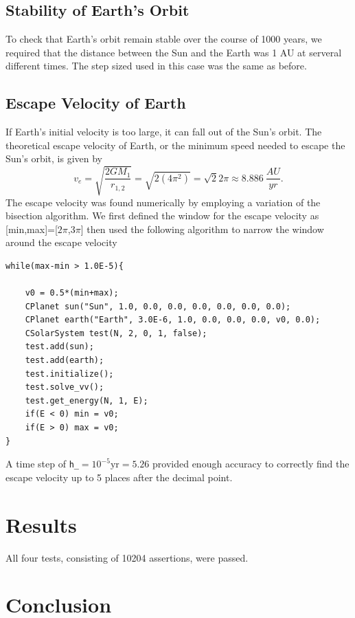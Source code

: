 \documentclass[prb,aps,twocolumn,showpacs,10pt]{revtex4-1}
\begin{document}
\subsection{Stability of Earth's Orbit}
To check that Earth's orbit remain stable over the course of 1000 years, we required that the distance between the Sun and the Earth was 1 AU at serveral different times. The step sized used in this case was the same as before.

\subsection{Escape Velocity of Earth}
If Earth's initial velocity is too large, it can fall out of the Sun's orbit. The theoretical escape velocity of Earth, or the minimum speed needed to escape the Sun's orbit, is given by 
\begin{equation}
v_e = \sqrt{\frac{2GM_1}{r_{1,2}}} = \sqrt{2(4\pi^2)} = \sqrt{2}2\pi \approx 8.886\  \frac{AU}{yr}.
\end{equation}
The escape velocity was found numerically by employing a variation of the bisection algorithm. We first defined the window for the escape velocity as [min,max]=[$2\pi$,$3\pi$] then used the following algorithm to narrow the window around the escape velocity
\begin{lstlisting}
while(max-min > 1.0E-5){

	v0 = 0.5*(min+max);
	CPlanet sun("Sun", 1.0, 0.0, 0.0, 0.0, 0.0, 0.0, 0.0);
	CPlanet earth("Earth", 3.0E-6, 1.0, 0.0, 0.0, 0.0, v0, 0.0);
	CSolarSystem test(N, 2, 0, 1, false);
	test.add(sun);
	test.add(earth);
	test.initialize();
	test.solve_vv();
	test.get_energy(N, 1, E);
	if(E < 0) min = v0;
	if(E > 0) max = v0;
}
\end{lstlisting}
A time step of \texttt{h\_}$=10^{-5} \text{yr}=5.26$ provided enough accuracy to correctly find the escape velocity up to 5 places after the decimal point. 

\section{Results}
All four tests, consisting of 10204 assertions, were passed. 

\section{Conclusion}
\end{document}
